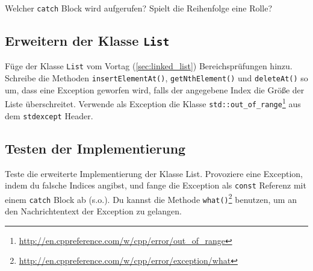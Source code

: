 Welcher \lstinline{catch} Block wird aufgerufen?
Spielt die Reihenfolge eine Rolle?

\subsection{Erweitern der Klasse \lstinline{List}}
Füge der Klasse \lstinline{List} vom Vortag (\ref{sec:linked_list}) Bereichsprüfungen hinzu.
Schreibe die Methoden \lstinline{insertElementAt()}, \lstinline{getNthElement()} und \lstinline{deleteAt()} so um, dass eine Exception geworfen wird, falls der angegebene Index die Größe der Liste überschreitet.
Verwende als Exception die Klasse \lstinline{std::out_of_range}\footnote{\url{http://en.cppreference.com/w/cpp/error/out_of_range}} aus dem \lstinline{stdexcept} Header.


\subsection{Testen der Implementierung}
Teste die erweiterte Implementierung der Klasse List.
Provoziere eine Exception, indem du falsche Indices angibst, und fange die Exception als \lstinline{const} Referenz mit einem \lstinline{catch} Block ab (s.o.).
Du kannst die Methode \lstinline{what()}\footnote{\url{http://en.cppreference.com/w/cpp/error/exception/what}} benutzen, um an den Nachrichtentext der Exception zu gelangen.

